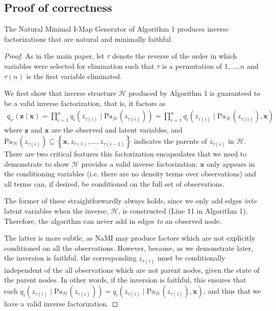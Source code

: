 \subsection{Proof of correctness}\vspace{3pt}
\begin{theorem}\label{theorem:correctness}
	The Natural Minimal I-Map Generator of Algorithm 1 produces inverse factorizations that are natural and minimally faithful.
\end{theorem}\vspace{-11pt}
\begin{proof}

As in the main paper, let $\tau$ denote the reverse of the order in which variables were selected for elimination
such that $\tau$ is a permutation of $1,\dots,n$ and $\tau(n)$ is the first variable eliminated.  

We first show that inverse structure $\mathcal{H}$ produced by Algorithm 1 is guaranteed to be a valid inverse factorization, that is, it factors as
\begin{align}
\label{eq:H-fact}
q_\psi(\mathbf{z}\mid\mathbf{x})=\prod^n_{i=1} q_{i}(z_{\tau(i)}\mid\text{Pa}_\mathcal{H}(z_{\tau(i)}))
=\prod^n_{i=1} q_{i}(z_{\tau(i)}\mid\text{Pa}_\mathcal{H}(z_{\tau(i)}),\mathbf{x})
\end{align}
where $\mathbf{z}$ and $\mathbf{x}$ are the observed and latent variables, and
$\text{Pa}_\mathcal{H}(z_{\tau(i)})\subseteq\left\{\mathbf{x},z_{\tau(1)},\dots,z_{\tau(i-1)}\right\}$ indicates the parents of $z_{\tau(i)}$ in $\mathcal{H}$.
There are two critical features this factorization encapsulates that we need to demonstrate to show
  $\mathcal{H}$ provides a valid  inverse factorization: $\mathbf{x}$ only appears in the conditioning variables (i.e. 
  there are no density terms over observations) and all terms can, if desired, be conditioned on the full
  set of observations.  
  
  The former of these straightforwardly always holds, since we only add edges \emph{into} latent variables when the inverse, $\mathcal{H}$, is constructed (Line 11 in Algorithm 1). Therefore, the algorithm can never add in edges \emph{to} an observed node.  
  
  The latter is more subtle, as NaMI may produce factors which are not explicitly
  conditioned on all the observations.  However, because, as we demonstrate later, the inversion is faithful, the
  corresponding $z_{\tau(i)}$ must be conditionally independent of the all observations which are not parent nodes, given
  the state of the parent nodes.  In other words, if the inversion is faithful, this ensures that 
  each $q_{i}(z_{\tau(i)}\mid\text{Pa}_\mathcal{H}(z_{\tau(i)}))=
  q_{i}(z_{\tau(i)}\mid\text{Pa}_\mathcal{H}(z_{\tau(i)}),\mathbf{x})$, and
  thus that we have a valid inverse factorization.


\end{proof}
